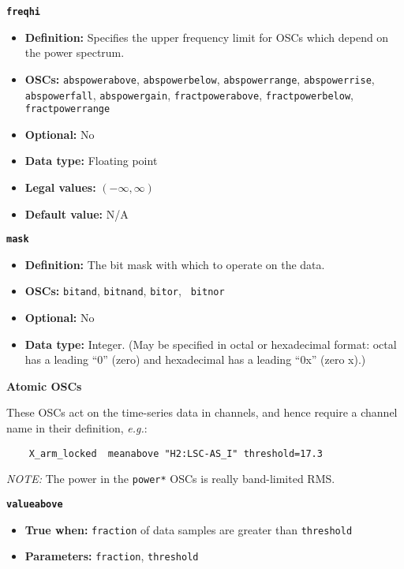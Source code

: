 {{\large\texttt{\textbf{freqhi}}}
\begin{itemize}
\item \textbf{Definition:} Specifies the upper frequency limit for OSCs
  which depend on the power spectrum.
\item \textbf{OSCs:} \texttt{abspowerabove}, \texttt{abspowerbelow}, 
  \texttt{abspowerrange}, 
  \texttt{abspowerrise},
  \texttt{abspowerfall},
  \texttt{abspowergain},
  \texttt{fractpowerabove}, 
  \texttt{fractpowerbelow}, \texttt{fractpowerrange} 
\item \textbf{Optional:} No
\item \textbf{Data type:} Floating point
\item \textbf{Legal values:} $(-\infty, \infty)$
\item \textbf{Default value:} N/A
\end{itemize}

{\large\texttt{\textbf{mask}}}
\begin{itemize}
\item \textbf{Definition:} The bit mask with which to operate on the
  data.
\item \textbf{OSCs:} \texttt{bitand}, \texttt{bitnand}, \texttt{bitor}, \texttt{
    bitnor}
\item \textbf{Optional:} No
\item \textbf{Data type:} Integer. (May be specified in octal or
  hexadecimal format: octal has a leading ``0'' (zero) and hexadecimal
  has a leading ``0x'' (zero x).)
\end{itemize}


\begin{center}
  \textbf{Atomic OSCs}
\end{center}

These OSCs act on the time-series data in channels, and hence require
a channel name in their definition, \textit{e.g.}:

\begin{verbatim}
    X_arm_locked  meanabove "H2:LSC-AS_I" threshold=17.3
\end{verbatim}

\textit{NOTE:} The power in the \texttt{power*} OSCs is really
band-limited RMS.


{\large\texttt{\textbf{valueabove}}}

\begin{itemize}
\item \textbf{True when:} \texttt{fraction} of data samples are greater than
  \texttt{threshold}
\item \textbf{Parameters:} \texttt{fraction}, \texttt{threshold}
\end{itemize}


}
